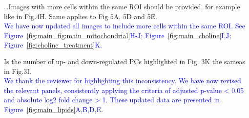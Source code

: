 \dots Images with more cells within the same ROI should be provided, for example like in Fig.4H. Same applies to Fig 5A, 5D and 5E.\\
\textcolor{blue}{We have now updated all images to include more cells within the same ROI. See Figure~\ref{fig:main_fig:main_mitochondrial}H-J; Figure~\ref{fig:main_choline}I,J; Figure~\ref{fig:choline_treatment}K.}

Is the number of up- and down-regulated PCs highlighted in Fig. 3K the sameas in Fig.3I.\\
\textcolor{blue}{We thank the reviewer for highlighting this inconsistency. We have now revised the relevant panels, consistently applying the criteria of adjusted p-value < 0.05 and absolute log2 fold change > 1. These updated data are presented in Figure~\ref{fig:main_lipids}A,B,D,E}.

